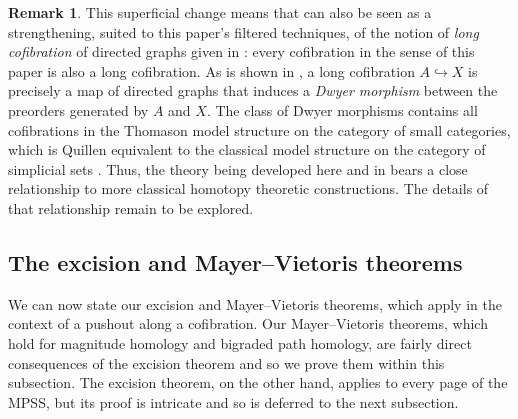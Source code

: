 \documentclass[a4paper, 11 pt, oneside, reqno]{amsart}
\numberwithin{lemma}{section}
\theoremstyle{definition}
\newtheorem{remark}[lemma]{Remark}
\newcommand{\demph}[1]{\emph{#1}}
\begin{document}
\begin{remark}
    This superficial change means that  can also be seen as a strengthening, suited to this paper's filtered techniques, of the notion of \demph{long cofibration} of directed graphs given in \cite[Definition 6.2]{HepworthRoff2023}: every cofibration in the sense of this paper is also a long cofibration. As is shown in \cite[Proposition 6.6]{HepworthRoff2023}, a long cofibration \(A \hookrightarrow X\) is precisely a map of directed graphs that induces a \demph{Dwyer morphism} between the preorders generated by \(A\) and \(X\). The class of Dwyer morphisms contains all cofibrations in the Thomason model structure on the category of small categories, which is Quillen equivalent to the classical model structure on the category of simplicial sets \cite{Thomason1980,Cisinski}. Thus, the theory being developed here and in  bears a close relationship to more classical homotopy theoretic constructions. The details of that relationship remain to be explored.
\end{remark}




\subsection{The excision and Mayer--Vietoris theorems}
\label{sec:excision-Mayer--Vietoris}

We can now state our excision and Mayer--Vietoris theorems,
which apply in the context of a pushout along a cofibration.
Our Mayer--Vietoris theorems, which hold for magnitude homology
and bigraded path homology, are fairly direct consequences of 
the excision theorem and so we prove them within this subsection.
The excision theorem, on the other hand, applies to every page
of the MPSS, but its proof is intricate
and so is deferred to the next subsection. 
\end{document}
